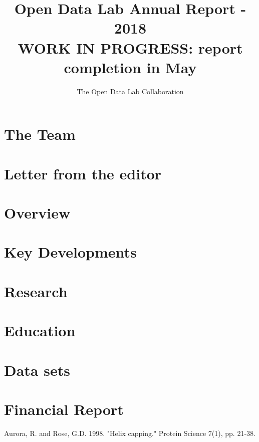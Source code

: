 \documentclass[12pt,letterpaper]{report} %
\title{Open Data Lab Annual Report - 2018\\
\large WORK IN PROGRESS: report completion in May }
\author{The Open Data Lab Collaboration}
\begin{document}
\maketitle

\chapter*{The Team}   %

\chapter*{Letter from the editor}   %

\tableofcontents
\pagebreak

\chapter{Overview} 

\chapter{Key Developments} 

\chapter{Research} 

\chapter{Education} 

\chapter{Data sets} 
	
\chapter{Financial Report} 



\begin{thebibliography}{99}

 Aurora, R. and Rose, G.D. 1998. "Helix capping." Protein Science 7(1), pp. 21-38.

\end{thebibliography}
\end{document}
